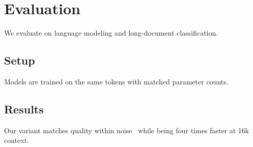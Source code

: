 \section{Evaluation}\label{sec:eval}
We evaluate on language modeling and long-document classification.

\subsection{Setup}\label{sec:setup}
Models are trained on the same tokens with matched parameter counts.

\subsection{Results}\label{sec:results}
Our variant matches quality within noise~\cite{wang2020linformer} while being
four times faster at 16k context.
